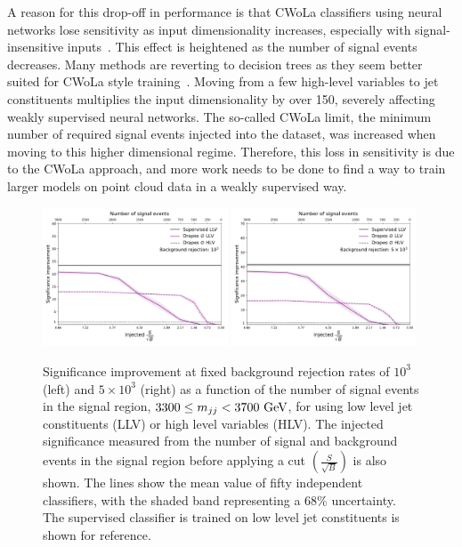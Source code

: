 A reason for this drop-off in performance is that CWoLa classifiers using neural networks lose sensitivity as input dimensionality increases, especially with signal-insensitive inputs~\cite{lacathode}.
This effect is heightened as the number of signal events decreases.
Many methods are reverting to decision trees as they seem better suited for CWoLa style training~\cite{TreebasedAlgorithmsWeakly, AnomalyDetectionPresence}.
Moving from a few high-level variables to jet constituents multiplies the input dimensionality by over 150, severely affecting weakly supervised neural networks.
The so-called CWoLa limit, the minimum number of required signal events injected into the dataset, was increased when moving to this higher dimensional regime.
Therefore, this loss in sensitivity is due to the CWoLa approach, and more work needs to be done to find a way to train larger models on point cloud data in a weakly supervised way.

\begin{figure}[hbpt]
    \centering
    \includegraphics[width=0.49\textwidth]{Figures/jet_generation/drapes/lowlevel_null_sic_vs_soverb_rej_1000.pdf}
    \includegraphics[width=0.49\textwidth]{Figures/jet_generation/drapes/lowlevel_null_sic_vs_soverb_rej_5000.pdf}
    \caption{Significance improvement at fixed background rejection rates of $10^3$ (left) and \mbox{$5 \times 10^3$} (right) as a function of the number of signal events in the signal region, \mbox{$3300\leq m_{jj}<3700~\GeV$}, for \drapes using low level jet constituents (LLV) or high level variables (HLV). The injected significance measured from the number of signal and background events in the signal region before applying a cut $(\frac{S}{\sqrt{B}})$ is also shown. The lines show the mean value of fifty independent classifiers, with the shaded band representing a 68\% uncertainty. The supervised classifier is trained on low level jet constituents is shown for reference.}
    \label{fig:drapes_llv}
\end{figure}

